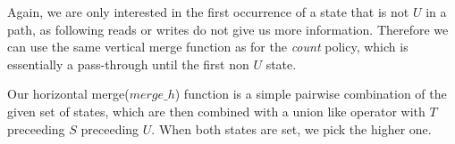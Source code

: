 Again, we are only interested in the first occurrence of a state that is not $U$ in a path, as following reads or writes do not give us more information. 
Therefore we can use the same vertical merge function as for the \emph{count} policy, which is essentially a pass-through until the first non $U$ state.

Our horizontal merge($merge\_h$) function is a simple pairwise combination of the given set of states, which are then combined with a union like 
operator with $T$ preceeding $S$ preceeding $U$. When both states are set, we pick the higher one.

%
%
%
